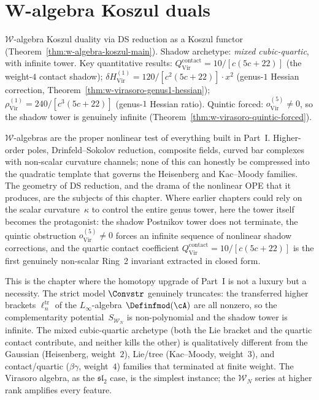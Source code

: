 \chapter{W-algebra Koszul duals}\label{chap:w-algebra-koszul}
\label{chap:w-algebras}

\begin{remark}
$\mathcal{W}$-algebra Koszul duality via DS reduction as a Koszul functor
(Theorem~\ref{thm:w-algebra-koszul-main}).
Shadow archetype: \emph{mixed cubic-quartic}, with infinite tower.
Key quantitative results:
$Q^{\mathrm{contact}}_{\mathrm{Vir}} = 10/[c(5c+22)]$
(the weight-$4$ contact shadow);
$\delta H^{(1)}_{\mathrm{Vir}} = 120/[c^2(5c{+}22)] \cdot x^2$
(genus-$1$ Hessian correction,
Theorem~\ref{thm:w-virasoro-genus1-hessian});
$\rho^{(1)}_{\mathrm{Vir}} = 240/[c^3(5c{+}22)]$ (genus-$1$
Hessian ratio).
Quintic forced: $o^{(5)}_{\mathrm{Vir}} \neq 0$, so the shadow
tower is genuinely infinite
(Theorem~\ref{thm:w-virasoro-quintic-forced}).
\end{remark}

$\mathcal{W}$-algebras are the proper nonlinear test of everything
built in Part~I.  Higher-order poles, Drinfeld--Sokolov reduction,
composite fields, curved bar complexes with non-scalar curvature
channels; none of this can honestly be compressed into the quadratic
template that governs the Heisenberg and Kac--Moody families.  The
geometry of DS reduction, and the drama of the nonlinear OPE that it
produces, are the subjects of this chapter.  Where earlier chapters
could rely on the scalar curvature~$\kappa$ to control the entire
genus tower, here the tower itself becomes the protagonist: the shadow
Postnikov tower does not terminate, the quintic obstruction
$o^{(5)}_{\mathrm{Vir}} \neq 0$ forces an infinite sequence of
nonlinear shadow corrections, and the quartic contact coefficient
$Q^{\mathrm{contact}}_{\mathrm{Vir}} = 10/[c(5c+22)]$ is the first
genuinely non-scalar Ring~2 invariant extracted in closed form.

This is the chapter where the homotopy upgrade of Part~I is not a
luxury but a necessity.  The strict model $\Convstr$ genuinely
truncates: the transferred higher brackets $\ell_n^{\mathrm{tr}}$
of the $L_\infty$-algebra $\Definfmod(\cA)$ are all nonzero, so the
complementarity potential~$S_{\mathcal{W}_N}$ is non-polynomial and
the shadow tower is infinite.  The mixed cubic-quartic archetype (both the Lie bracket and the quartic contact contribute, and neither
kills the other) is qualitatively different from the
Gaussian (Heisenberg, weight~$2$), Lie/tree (Kac--Moody, weight~$3$),
and contact/quartic ($\beta\gamma$, weight~$4$) families that
terminated at finite weight.  The Virasoro algebra, as the
$\mathfrak{sl}_2$ case, is the simplest instance; the $\mathcal{W}_N$
series at higher rank amplifies every feature.

